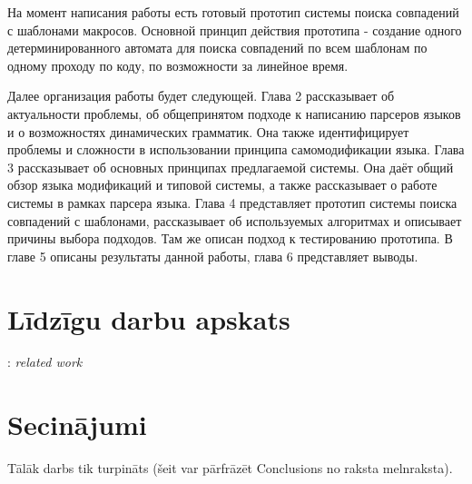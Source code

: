 \documentclass[12pt, a4paper]{report}
\newcommand{\fixme}[1]{\vskip 5mm\noindent{\bf FIXME}: {\it #1}}
\begin{document}
На момент написания работы есть готовый прототип системы поиска совпадений с шаблонами макросов. Основной принцип действия прототипа - создание одного детерминированного автомата для поиска совпадений по всем шаблонам по одному проходу по коду, по возможности за линейное время.

Далее организация работы будет следующей. Глава 2 рассказывает об актуальности проблемы, об общепринятом подходе к написанию парсеров языков и о возможностях динамических грамматик. Она также идентифицирует проблемы и сложности в использовании принципа самомодификации языка. Глава 3 рассказывает об основных принципах предлагаемой системы. Она даёт общий обзор языка модификаций и типовой системы, а также рассказывает о работе системы в рамках парсера языка. Глава 4 представляет прототип системы поиска совпадений с шаблонами, рассказывает об используемых алгоритмах и описывает причины выбора подходов. Там же описан подход к тестированию прототипа. В главе 5 описаны результаты данной работы, глава 6 представляет выводы.



%





\section{Līdzīgu darbu apskats}

\fixme{related work}



\section{Secinājumi}

Tālāk darbs tik turpināts (šeit var pārfrāzēt Conclusions no raksta melnraksta).



%

{}

\end{document}
